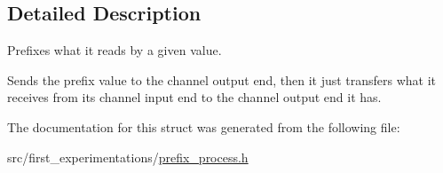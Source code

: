 \subsection{Detailed Description}
Prefixes what it reads by a given value. 

Sends the prefix value to the channel output end, then it just transfers what it receives from its channel input end to the channel output end it has. 

The documentation for this struct was generated from the following file\-:\begin{DoxyCompactItemize}
\item 
src/first\-\_\-experimentations/\hyperlink{prefix__process_8h}{prefix\-\_\-process.\-h}\end{DoxyCompactItemize}
